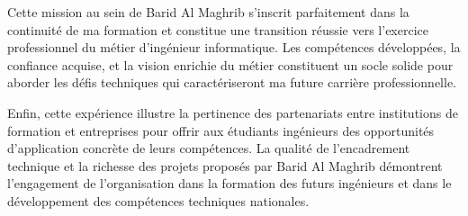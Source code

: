 Cette mission au sein de Barid Al Maghrib s'inscrit parfaitement dans la continuité de ma formation et constitue une transition réussie vers l'exercice professionnel du métier d'ingénieur informatique. Les compétences développées, la confiance acquise, et la vision enrichie du métier constituent un socle solide pour aborder les défis techniques qui caractériseront ma future carrière professionnelle.

Enfin, cette expérience illustre la pertinence des partenariats entre institutions de formation et entreprises pour offrir aux étudiants ingénieurs des opportunités d'application concrète de leurs compétences. La qualité de l'encadrement technique et la richesse des projets proposés par Barid Al Maghrib démontrent l'engagement de l'organisation dans la formation des futurs ingénieurs et dans le développement des compétences techniques nationales.